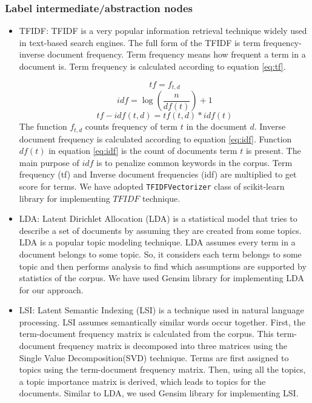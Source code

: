 \subsubsection{Label intermediate/abstraction nodes}
\begin{itemize}
    \item TFIDF:
TFIDF \cite{ramos2003usingTfidfRelevance} is a very popular information retrieval technique widely used in text-based search engines. The full form of the TFIDF is term frequency-inverse document frequency. Term frequency means how frequent a term in a document is. Term frequency is calculated according to equation \ref{eq:tf}.

\begin{equation}
    tf = f_{t,d}
    \label{eq:tf}
\end{equation}
\begin{equation}
    idf = \log(\frac{n}{df(t)})+1
    \label{eq:idf}
\end{equation}
\begin{equation}
    tf-idf(t,d) = tf(t,d) * idf(t)
    \label{eq:TFIDF}
\end{equation}
The function $f_{t,d}$ counts frequency of term $t$ in the document $d$. Inverse document frequency is calculated according to equation \ref{eq:idf}. Function $df(t)$ in equation \ref{eq:idf} is the count of documents term $t$ is present. The main purpose of $idf$ is to penalize common keywords in the corpus. Term frequency (tf) and Inverse document frequencies (idf) are multiplied to get score for terms. We have adopted \texttt{TFIDFVectorizer} class of scikit-learn \cite{scikit-learn} library for implementing $TFIDF$ technique.
    \item LDA:
Latent Dirichlet Allocation (LDA) \cite{blei2003latentLDA} is a statistical model that tries to describe a set of documents by assuming they are created from some topics. LDA is a popular topic modeling technique. LDA assumes every term in a document belongs to some topic. So, it considers each term belongs to some topic and then performs analysis to find which assumptions are supported by statistics of the corpus. We have used Gensim \cite{gensim} library for implementing LDA for our approach.
    \item LSI:
Latent Semantic Indexing (LSI) \cite{deerwester1990indexingLSI} is a technique used in natural language processing. LSI assumes semantically similar words occur together. First, the term-document frequency matrix is calculated from the corpus. This term-document frequency matrix is decomposed into three matrices using the Single Value Decomposition(SVD) technique. Terms are first assigned to topics using the term-document frequency matrix. Then, using all the topics, a topic importance matrix is derived, which leads to topics for the documents. Similar to LDA, we used Gensim \cite{gensim} library for implementing LSI. 
\end{itemize}

